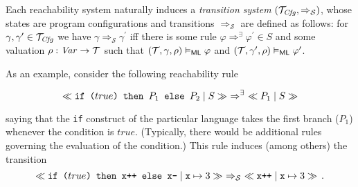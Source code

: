 Each reachability system naturally induces a \emph{transition system}
$(\mathcal{T}_{\mathit{Cfg}} , \Rightarrow_{\mathcal{S}})$, whose states are program configurations
and transitions $\Rightarrow_{\mathcal{S}}$ are defined as follows: for
$\gamma, \gamma^\prime \in \mathcal{T}_{\mathit{Cfg}}$ we have
$\gamma \Rightarrow_{\mathcal{S}} \gamma^\prime$ iff there is some rule
$\varphi \Rightarrow^\exists \varphi^\prime \in S$ and some valuation
$\rho : \mathit{Var} \to \mathcal{T}$ such that $(\mathcal{T}, \gamma, \rho) \vDash_{\mathsf{ML}} \varphi$ and
$(\mathcal{T}, \gamma^\prime , \rho) \vDash_{\mathsf{ML}} \varphi^\prime$.

As an example, consider the following reachability rule

\begin{equation}\label{eqn:ruleIfTrue}
    \tap{if ($true$) then $P_1$ else $P_2$}{S} \ \Rightarrow^{\exists}\ \tap{$P_1$}{S}
\end{equation}

saying that the \texttt{if} construct of the particular language takes the first branch ($P_1$)
whenever the condition is $\mathit{true}$. (Typically, there would be additional rules
governing the evaluation of the condition.)
%
This rule induces (among others) the transition
\begin{equation}\label{eqn:ruleIfTrue}
  \ll\texttt{if ($true$) then x++ else x--}\mid \mathtt{x}\mapsto 3\gg\
  \Rightarrow_{\mathcal{S}}\  \ll\texttt{x++}\mid \mathtt{x}\mapsto 3\gg \,.
\end{equation}






